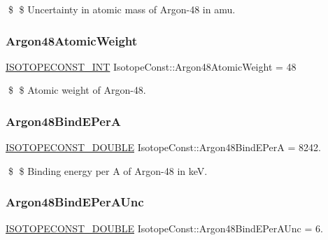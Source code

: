 \$ \$ Uncertainty in atomic mass of Argon-\/48 in amu. \mbox{\label{group___isotope_const-_argon-_ar48_ga29a5041209f022d6c771689913a5384a}} 
\subsubsection{\texorpdfstring{Argon48\+Atomic\+Weight}{Argon48AtomicWeight}}
{\footnotesize\ttfamily \mbox{\hyperlink{group___isotope_const-_macros_ga5f18360b3e99483a35c32d789e62621c}{I\+S\+O\+T\+O\+P\+E\+C\+O\+N\+S\+T\+\_\+\+I\+NT}} Isotope\+Const\+::\+Argon48\+Atomic\+Weight = 48}

\$ \$ Atomic weight of Argon-\/48. \mbox{\label{group___isotope_const-_argon-_ar48_ga0d43bb6e74dbf51c4f727ab526a1605e}} 
\subsubsection{\texorpdfstring{Argon48\+Bind\+E\+PerA}{Argon48BindEPerA}}
{\footnotesize\ttfamily \mbox{\hyperlink{group___isotope_const-_macros_ga8f45a7272ce02c0b4c65c44636ed719a}{I\+S\+O\+T\+O\+P\+E\+C\+O\+N\+S\+T\+\_\+\+D\+O\+U\+B\+LE}} Isotope\+Const\+::\+Argon48\+Bind\+E\+PerA = 8242.}

\$ \$ Binding energy per A of Argon-\/48 in keV. \mbox{\label{group___isotope_const-_argon-_ar48_gaea30594203a4d83255eb481d85a84a52}} 
\subsubsection{\texorpdfstring{Argon48\+Bind\+E\+Per\+A\+Unc}{Argon48BindEPerAUnc}}
{\footnotesize\ttfamily \mbox{\hyperlink{group___isotope_const-_macros_ga8f45a7272ce02c0b4c65c44636ed719a}{I\+S\+O\+T\+O\+P\+E\+C\+O\+N\+S\+T\+\_\+\+D\+O\+U\+B\+LE}} Isotope\+Const\+::\+Argon48\+Bind\+E\+Per\+A\+Unc = 6.}

